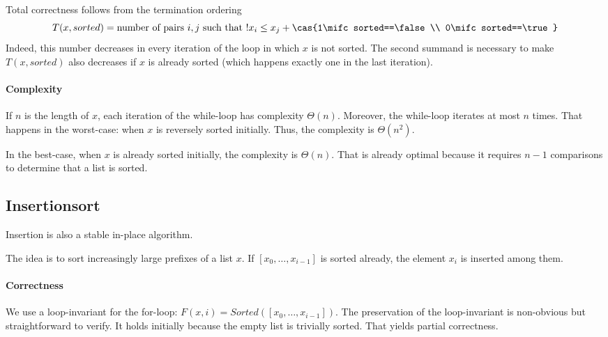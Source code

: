 Total correctness follows from the termination ordering
 \[T(x,sorted)=\text{number of pairs $i,j$ such that $! x_i\leq x_j$} + \cas{1\mifc sorted==\false\\ 0\mifc sorted==\true}\]
Indeed, this number decreases in every iteration of the loop in which $x$ is not sorted.
The second summand is necessary to make $T(x,sorted)$ also decreases if $x$ is already sorted (which happens exactly one in the last iteration).

\paragraph{Complexity}
If $n$ is the length of $x$, each iteration of the while-loop has complexity $\Theta(n)$.
Moreover, the while-loop iterates at most $n$ times.
That happens in the worst-case: when $x$ is reversely sorted initially.
Thus, the complexity is $\Theta(n^2)$.

In the best-case, when $x$ is already sorted initially, the complexity is $\Theta(n)$.
That is already optimal because it requires $n-1$ comparisons to determine that a list is sorted.

\subsection{Insertionsort}

Insertion is also a stable in-place algorithm.

The idea is to sort increasingly large prefixes of a list $x$.
If $[x_0,\ldots,x_{i-1}]$ is sorted already, the element $x_i$ is inserted among them.

\begin{acode}
\end{acode}

\paragraph{Correctness}
We use a loop-invariant for the for-loop: $F(x,i)=Sorted([x_0,\ldots,x_{i-1}])$.
The preservation of the loop-invariant is non-obvious but straightforward to verify.
It holds initially because the empty list is trivially sorted.
That yields partial correctness.

